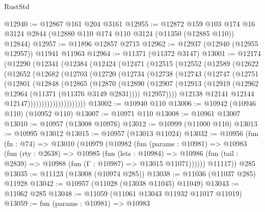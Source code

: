 \begin{lexlean}{RustStd}
\begin{coremodule}
{\begin{coremodule}
{{{{{{{{{{{{{{{{{{{{{{{{{{{{{{{{{@12940 := @12867 @161 @204 @3161
@12955 := @12872
    @159
    @103
    @174
    @16
    @3124
    @2844
    (@12880 @110 @174 @110 @3124 (@11350 (@12885 @110)) @12844)
@12957 := @11896 @12857 @2715
@12962 := @12937 (@12940 (@12955 @12957)) @11941 @11963
@12964 := @11371 (@11372 @3147)
@13001 := @12174
    (@12290
      (@12341
        (@12384
          (@12424
            (@12471
              (@12515
                (@12552
                  (@12589
                    (@12622
                      (@12652
                        (@12682
                          (@12703
                            (@12720
                              (@12734
                                (@12738
                                  (@12743
                                    (@12747
                                      (@12751
                                        (@12801
                                          (@12848
                                            (@12865
                                              (@12870
                                                (@12890
                                                  (@12907
                                                    (@12913
                                                      (@12919
                                                        (@12962
                                                          @12964
                                                          (@11371 (@11376 @3149 @2831))))
                                                      @12957))))
                                              @12138
                                              @12141
                                              @12144
                                              @12147)))))))))))))))))))))
@13002 := @10940 @110
@13006 := @10942 (@10946 @110) (@10952 @110)
@13007 := @10971 @110
@13008 := @10961 @13007
@13010 := @10957 (@13008 @10976)
@13012 := @10999 (@11000 @110)
@13013 := @10995 @13012
@13015 := @10957 (@13013 @11024)
@13032 := @10956
    (fun (fn : @74) =>
    @13010
      (@10979
        (@10982
          (fun (params : @10981) =>
          @10983
            (fun (rty : @2638) =>
            @10985
              (fun (lets : @10984) =>
              @10986 (fun (tail : @2839) => @10988 (fun (Γ : @10987) => @13015 @11071))))))
        @11117))
    @285
@13035 := @11123 (@13008 (@10974 @285))
@13038 := @11036 (@11037 @285) @11928
@13042 := @10957 (@11028 (@13038 @11045) @11049)
@13043 := @11062 @285
@13048 := @11059 (@11061 @13043 @11932 @11017 @11019)
@13059 := fun (params : @10981) =>
  @10983
}}}}}}}}}}}}}}}}}}}}}}}}}}}}}}}}}
\end{coremodule}}
\end{coremodule}
\end{lexlean}
